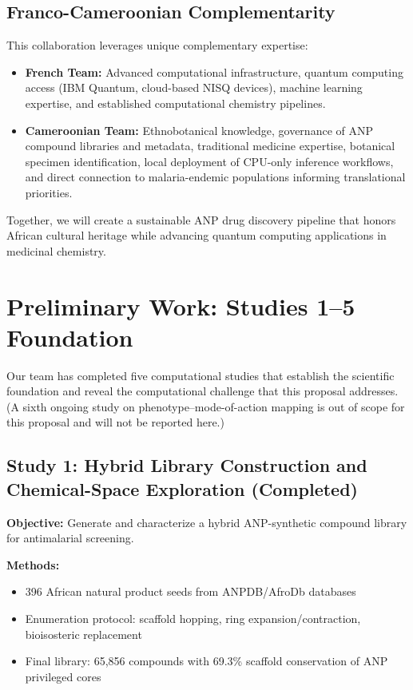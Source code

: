 \documentclass[11pt,a4paper]{article}
\begin{document}
\subsection{Franco-Cameroonian Complementarity}

This collaboration leverages unique complementary expertise:

\begin{itemize}[leftmargin=1.5em]
    \item \textbf{French Team:} Advanced computational infrastructure, quantum computing access (IBM Quantum, cloud-based NISQ devices), machine learning expertise, and established computational chemistry pipelines.
    \item \textbf{Cameroonian Team:} Ethnobotanical knowledge, governance of ANP compound libraries and metadata, traditional medicine expertise, botanical specimen identification, local deployment of CPU-only inference workflows, and direct connection to malaria-endemic populations informing translational priorities.
\end{itemize}

Together, we will create a sustainable ANP drug discovery pipeline that honors African cultural heritage while advancing quantum computing applications in medicinal chemistry.

\section{Preliminary Work: Studies 1--5 Foundation}

Our team has completed five computational studies that establish the scientific foundation and reveal the computational challenge that this proposal addresses. (A sixth ongoing study on phenotype--mode-of-action mapping is out of scope for this proposal and will not be reported here.)

\subsection{Study 1: Hybrid Library Construction and Chemical-Space Exploration (Completed)}

\textbf{Objective:} Generate and characterize a hybrid ANP-synthetic compound library for antimalarial screening.

\textbf{Methods:}
\begin{itemize}
    \item 396 African natural product seeds from ANPDB/AfroDb databases \cite{ntiekang2013}
    \item Enumeration protocol: scaffold hopping, ring expansion/contraction, bioisosteric replacement
    \item Final library: 65,856 compounds with 69.3\% scaffold conservation of ANP privileged cores \cite{bemis1996}
\end{itemize}
\end{document}
